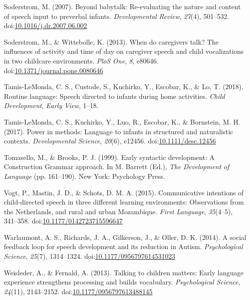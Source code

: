 \documentclass[floatsintext,man]{apa6}
\theoremstyle{definition}
\theoremstyle{definition}
\theoremstyle{definition}
\theoremstyle{remark}
\begin{document}
\hypertarget{ref-soderstrom2007beyond}{}
Soderstrom, M. (2007). Beyond babytalk: Re-evaluating the nature and
content of speech input to preverbal infants. \emph{Developmental
Review}, \emph{27}(4), 501--532.
doi:\href{https://doi.org/10.1016/j.dr.2007.06.002}{10.1016/j.dr.2007.06.002}

\hypertarget{ref-soderstrom2013when}{}
Soderstrom, M., \& Wittebolle, K. (2013). When do caregivers talk? The
influences of activity and time of day on caregiver speech and child
vocalizations in two childcare environments. \emph{PloS One}, \emph{8},
e80646.
doi:\href{https://doi.org/10.1371/journal.pone.0080646}{10.1371/journal.pone.0080646}

\hypertarget{ref-tamislemonda2018routine}{}
Tamis-LeMonda, C. S., Custode, S., Kuchirko, Y., Escobar, K., \& Lo, T.
(2018). Routine language: Speech directed to infants during home
activities. \emph{Child Development}, \emph{Early View}, 1--18.

\hypertarget{ref-tamislemonda2017power}{}
Tamis-LeMonda, C. S., Kuchirko, Y., Luo, R., Escobar, K., \& Bornstein,
M. H. (2017). Power in methods: Language to infants in structured and
naturalistic contexts. \emph{Developmental Science}, \emph{20}(6),
e12456.
doi:\href{https://doi.org/10.1111/desc.12456}{10.1111/desc.12456}

\hypertarget{ref-tomasello1999early}{}
Tomasello, M., \& Brooks, P. J. (1999). Early syntactic development: A
Construction Grammar approach. In M. Barrett (Ed.), \emph{The
Development of Language} (pp. 161--190). New York: Psychology Press.

\hypertarget{ref-vogt2015communicative}{}
Vogt, P., Mastin, J. D., \& Schots, D. M. A. (2015). Communicative
intentions of child-directed speech in three different learning
environments: Observations from the Netherlands, and rural and urban
Mozambique. \emph{First Language}, \emph{35}(4--5), 341--358.
doi:\href{https://doi.org/10.1177/0142723715596647}{10.1177/0142723715596647}

\hypertarget{ref-warlaumont2014social}{}
Warlaumont, A. S., Richards, J. A., Gilkerson, J., \& Oller, D. K.
(2014). A social feedback loop for speech development and its reduction
in Autism. \emph{Psychological Science}, \emph{25}(7), 1314--1324.
doi:\href{https://doi.org/10.1177/0956797614531023}{10.1177/0956797614531023}

\hypertarget{ref-weisleder2013talking}{}
Weisleder, A., \& Fernald, A. (2013). Talking to children matters: Early
language experience strengthens processing and builds vocabulary.
\emph{Psychological Science}, \emph{24}(11), 2143--2152.
doi:\href{https://doi.org/10.1177/0956797613488145}{10.1177/0956797613488145}
\end{document}

